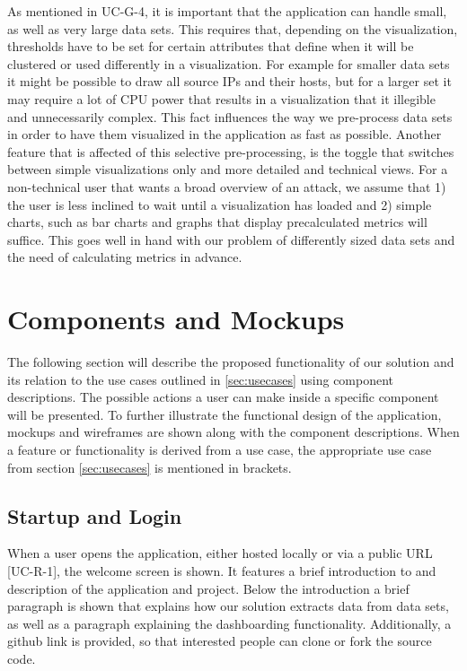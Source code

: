 As mentioned in UC-G-4, it is important that the application can handle small, as well as very large data sets. This requires that, depending on the visualization, thresholds have to be set for certain attributes that define when it will be clustered or used differently in a visualization. For example for smaller data sets it might be possible to draw all source IPs and their hosts, but for a larger set it may require a lot of CPU power that results in a visualization that it illegible and unnecessarily complex. This fact influences the way we pre-process data sets in order to have them visualized in the application as fast as possible. Another feature that is affected of this selective pre-processing, is the toggle that switches between simple visualizations only and more detailed and technical views. For a non-technical user that wants a broad overview of an attack, we assume that 1) the user is less inclined to wait until a visualization has loaded and 2) simple charts, such as bar charts and graphs that display precalculated metrics will suffice. This goes well in hand with our problem of differently sized data sets and the need of calculating metrics in advance.


\section{Components and Mockups}\label{components}
The following section will describe the proposed functionality of our solution and its relation to the use cases outlined in \ref{sec:usecases} using component descriptions. The possible actions a user can make inside a specific component will be presented. To further illustrate the functional design of the application, mockups and wireframes are shown along with the component descriptions. When a feature or functionality is derived from a use case, the appropriate use case from section \ref{sec:usecases} is mentioned in brackets.

\subsection{Startup and Login}
When a user opens the application, either hosted locally or via a public URL [UC-R-1], the welcome screen is shown. It features a brief introduction to and description of the application and project. Below the introduction a brief paragraph is shown that explains how our solution extracts data from data sets, as well as a paragraph explaining the dashboarding functionality. Additionally, a github link is provided, so that interested people can clone or fork the source code. 

